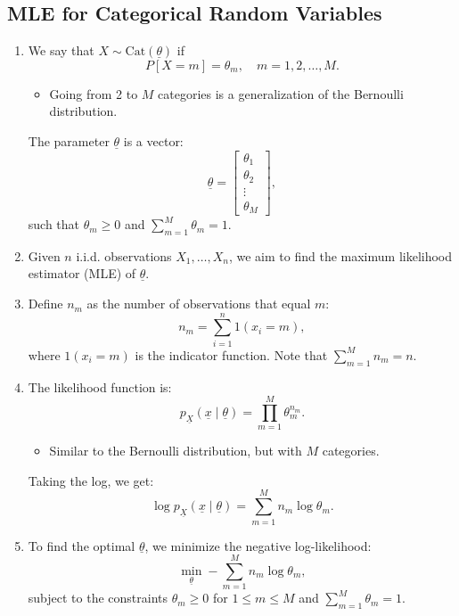 \subsection{MLE for Categorical Random Variables}
\begin{example}
    \begin{enumerate}
        \item We say that $X \sim \text{Cat}(\underline{\theta})$ if 
        \[
        P[X = m] = \theta_m, \quad m = 1, 2, \dots, M.
        \]
        \begin{itemize}
            \item Going from 2 to $M$ categories is a generalization of the Bernoulli distribution.
        \end{itemize}
        The parameter $\underline{\theta}$ is a vector:
        \[
        \underline{\theta} = 
        \begin{bmatrix}
        \theta_1 \\
        \theta_2 \\
        \vdots \\
        \theta_M
        \end{bmatrix},
        \]
        such that $\theta_m \geq 0$ and $\sum_{m=1}^M \theta_m = 1.$
    
        \item Given $n$ i.i.d. observations $X_1, \dots, X_n$, we aim to find the maximum likelihood estimator (MLE) of $\underline{\theta}$.
    
        \item Define $n_m$ as the number of observations that equal $m$:
        \[
        n_m = \sum_{i=1}^n 1(x_i = m),
        \]
        where $1(x_i = m)$ is the indicator function. Note that $\sum_{m=1}^M n_m = n.$
    
        \item The likelihood function is:
        \[
        p_{\underline{X}}(\underline{x} \mid \underline{\theta}) = \prod_{m=1}^M \theta_m^{n_m}.
        \]
        \begin{itemize}
            \item Similar to the Bernoulli distribution, but with $M$ categories.
        \end{itemize}
        Taking the log, we get:
        \[
        \log p_{\underline{X}}(\underline{x} \mid \underline{\theta}) = \sum_{m=1}^M n_m \log \theta_m.
        \]
    
        \item To find the optimal $\underline{\theta}$, we minimize the negative log-likelihood:
        \[
        \min_{\underline{\theta}} -\sum_{m=1}^M n_m \log \theta_m,
        \]
        subject to the constraints $\theta_m \geq 0$ for $1 \leq m \leq M$ and $\sum_{m=1}^M \theta_m = 1.$
    

\end{enumerate}
\end{example}
